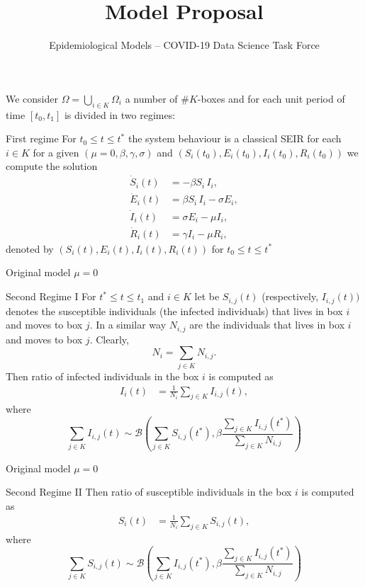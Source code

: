 \documentclass[10pt]{beamer}
\title{Model Proposal}
\author{Epidemiological Models -- COVID-19 Data Science Task Force}
\institute[]{}
\date{}
\begin{document}
\begin{frame}
\maketitle
\end{frame}

\begin{frame}
We consider $\Omega = \bigcup_{i \in K} \Omega_i$ a number of $\#K$-boxes and for
each unit period of time $[t_0,t_1]$ is divided in two regimes:
\begin{block}{First regime}
For $t_0 \le t \le t^*$ the system behaviour is a classical SEIR for
each $i \in K$ for a given $(\mu=0,\beta,\gamma,\sigma)$ and
$(S_i(t_0),E_i(t_0),I_i(t_0),R_i(t_0))$ we compute the solution
\begin{align}
\dot{S}_i(t) & = -\beta S_i \,I_i, \label{PSEIR1}\\
\dot{E}_i(t) & = \beta S_i \,I_i - \sigma E_i, \label{PSEIR2} \\
\dot{I}_i(t) & = \sigma E_i - \mu I_i, \label{PSEIR3}\\
\dot{R}_i(t) & = \gamma I_i - \mu R_i, \label{PSEIR4}
\end{align}
denoted by $(S_i(t),E_i(t),I_i(t),R_i(t))$ for $t_0 \le t \le t^*$
\end{block}

\end{frame}


\begin{frame}{Original model $\mu=0$}
\begin{block}{Second Regime I}
For $t^* \le t \le t_1$ and $i \in K$ let be
$S_{i,j}(t)$ (respectively, $I_{i,j}(t))$ denotes the susceptible individuals (the infected individuals) that lives in box $i$ and moves to 
box $j.$ In a similar way $N_{i,j}$ are the individuals that lives in box $i$ and moves to box $j.$
Clearly,
$$
N_i = \sum_{j \in K} N_{i,j}.
$$
Then ratio of infected individuals in the box $i$ is computed as
\begin{align*}
I_i(t) & = \frac{1}{N_i} \sum_{j \in K} I_{i,j}(t),
\end{align*}
where
$$
\sum_{j \in K} I_{i,j}(t) \sim \mathcal{B}\left( \sum_{j \in K} S_{i,j}(t^*), \beta
\frac{\sum_{j \in K} I_{i,j}(t^*)}{\sum_{j \in K}N_{i,j}}
 \right)
$$
\end{block}
\end{frame}


\begin{frame}{Original model $\mu=0$}
\begin{block}{Second Regime II}
Then ratio of susceptible individuals in the box $i$ is computed as
\begin{align*}
S_i(t) & = \frac{1}{N_i} \sum_{j \in K} S_{i,j}(t),
\end{align*}
where
$$
\sum_{j \in K} S_{i,j}(t) \sim \mathcal{B}\left( \sum_{j \in K} I_{i,j}(t^*), \beta
\frac{\sum_{j \in K} I_{i,j}(t^*)}{\sum_{j \in K}N_{i,j}}
 \right)
$$
\end{block}
\end{frame}
\end{document}
